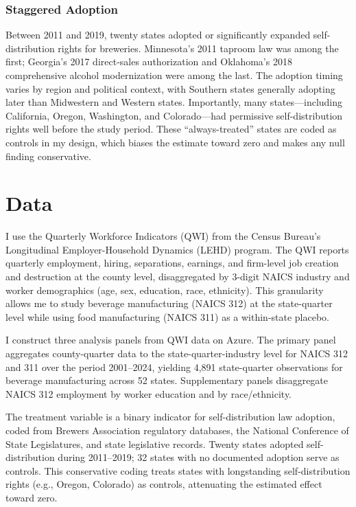\documentclass[12pt]{article}
\begin{document}
\subsubsection*{Staggered Adoption} Between 2011 and 2019, twenty states adopted or significantly expanded self-distribution rights for breweries. Minnesota's 2011 taproom law was among the first; Georgia's 2017 direct-sales authorization and Oklahoma's 2018 comprehensive alcohol modernization were among the last. The adoption timing varies by region and political context, with Southern states generally adopting later than Midwestern and Western states. Importantly, many states---including California, Oregon, Washington, and Colorado---had permissive self-distribution rights well before the study period. These ``always-treated'' states are coded as controls in my design, which biases the estimate toward zero and makes any null finding conservative.

\section{Data}

I use the Quarterly Workforce Indicators (QWI) from the Census Bureau's Longitudinal Employer-Household Dynamics (LEHD) program. The QWI reports quarterly employment, hiring, separations, earnings, and firm-level job creation and destruction at the county level, disaggregated by 3-digit NAICS industry and worker demographics (age, sex, education, race, ethnicity). This granularity allows me to study beverage manufacturing (NAICS 312) at the state-quarter level while using food manufacturing (NAICS 311) as a within-state placebo.

I construct three analysis panels from QWI data on Azure. The primary panel aggregates county-quarter data to the state-quarter-industry level for NAICS 312 and 311 over the period 2001--2024, yielding 4,891 state-quarter observations for beverage manufacturing across 52 states. Supplementary panels disaggregate NAICS 312 employment by worker education and by race/ethnicity.

The treatment variable is a binary indicator for self-distribution law adoption, coded from Brewers Association regulatory databases, the National Conference of State Legislatures, and state legislative records. Twenty states adopted self-distribution during 2011--2019; 32 states with no documented adoption serve as controls. This conservative coding treats states with longstanding self-distribution rights (e.g., Oregon, Colorado) as controls, attenuating the estimated effect toward zero.
\end{document}
